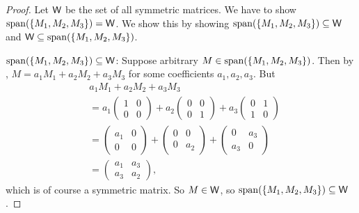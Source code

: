 \begin{proof}
Let \(\textsf{W}\) be the set of all symmetric matrices.
We have to show \(\operatorname{span}(\{M_1, M_2, M_3\}) = \textsf{W}\).
We show this by showing \(\operatorname{span}(\{M_1, M_2, M_3\}) \subseteq \textsf{W}\) and \(\textsf{W} \subseteq \operatorname{span}(\{M_1, M_2, M_3\})\).

\(\operatorname{span}(\{M_1, M_2, M_3\}) \subseteq \textsf{W}\): Suppose arbitrary \(M \in \operatorname{span}(\{M_1, M_2, M_3\})\).
Then by , \(M = a_1 M_1 + a_2 M_2 + a_3 M_3\) for some coefficients \(a_1, a_2, a_3\).
But
\begin{align*}
     & a_1 M_1 + a_2 M_2 + a_3 M_3 \\
     & = a_1 \begin{pmatrix}
            1 & 0 \\
            0 & 0
        \end{pmatrix}
        + a_2 \begin{pmatrix}
            0 & 0 \\
            0 & 1
        \end{pmatrix}
        + a_3 \begin{pmatrix}
            0 & 1 \\
            1 & 0
        \end{pmatrix} \\
    & = \begin{pmatrix}
            a_1 & 0 \\
            0 & 0
        \end{pmatrix}
        + \begin{pmatrix}
            0 & 0 \\
            0 & a_2
        \end{pmatrix}
        + \begin{pmatrix}
            0 & a_3 \\
            a_3 & 0
        \end{pmatrix} \\
    & = \begin{pmatrix}
            a_1 & a_3 \\
            a_3 & a_2
        \end{pmatrix},
\end{align*}
which is of course a symmetric matrix.
So \(M \in \textsf{W}\), so \(\operatorname{span}(\{M_1, M_2, M_3\}) \subseteq \textsf{W}\).


\end{proof}
